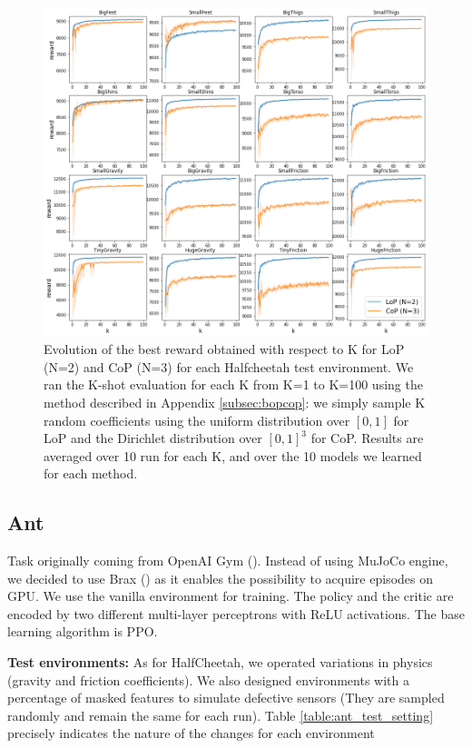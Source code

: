 \begin{figure}[h!]
\centering
\includegraphics[width=1.\linewidth]{images/K_evolution.png}
\caption{Evolution of the best reward obtained with respect to K for LoP (N=2) and CoP (N=3) for each Halfcheetah test environment. We ran the K-shot evaluation for each K from K=1 to K=100 using the method described in Appendix \ref{subsec:bopcop}: we simply sample K random coefficients using the uniform distribution over $[0,1]$ for LoP and the Dirichlet distribution over $[0,1]^3$ for CoP. Results are averaged over 10 run for each K, and over the 10 models we learned for each method.  }
\label{fig:K_evolution}
\end{figure}

\newpage


\subsection{Ant}
\label{subsec:ant}

Task originally coming from OpenAI Gym (\cite{OpenaiGym}). Instead of using MuJoCo engine, we decided to use Brax (\cite{brax2021github}) as it enables the possibility to acquire episodes on GPU. We use the vanilla environment for training. The policy and the critic are encoded by two different multi-layer perceptrons with ReLU activations. The base learning algorithm is PPO.

\textbf{Test environments:}  As for HalfCheetah, we operated variations in physics (gravity and friction coefficients). We also designed environments with a percentage of masked features to simulate defective sensors (They are sampled randomly and remain the same for each run). Table \ref{table:ant_test_setting} precisely indicates the nature of the changes for each environment

